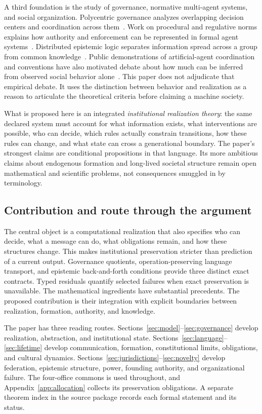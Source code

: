 \documentclass[11pt,letterpaper]{article}
\theoremstyle{plain}
\theoremstyle{definition}
\theoremstyle{remark}
\begin{document}
A third foundation is the study of governance, normative multi-agent systems, and social organization. Polycentric governance analyzes overlapping decision centers and coordination across them~\cite{ostrom,ostrombook}. Work on procedural and regulative norms explains how authority and enforcement can be represented in formal agent systems~\cite{boella,grossinorm}. Distributed epistemic logic separates information spread across a group from common knowledge~\cite{halpernmoses}. Public demonstrations of artificial-agent coordination and conventions have also motivated debate about how much can be inferred from observed social behavior alone~\cite{park,ashery,barrie,asheryreply}. This paper does not adjudicate that empirical debate. It uses the distinction between behavior and realization as a reason to articulate the theoretical criteria before claiming a machine society.

What is proposed here is an integrated \emph{institutional realization theory}: the same declared system must account for what information exists, what interventions are possible, who can decide, which rules actually constrain transitions, how these rules can change, and what state can cross a generational boundary. The paper's strongest claims are conditional propositions in that language. Its more ambitious claims about endogenous formation and long-lived societal structure remain open mathematical and scientific problems, not consequences smuggled in by terminology.

\subsection{Contribution and route through the argument}
The central object is a computational realization that also specifies who can decide, what a message can do, what obligations remain, and how these structures change. This makes institutional preservation stricter than prediction of a current output. Governance quotients, operation-preserving language transport, and epistemic back-and-forth conditions provide three distinct exact contracts. Typed residuals quantify selected failures when exact preservation is unavailable. The mathematical ingredients have substantial precedents. The proposed contribution is their integration with explicit boundaries between realization, formation, authority, and knowledge.

The paper has three reading routes. Sections~\ref{sec:model}--\ref{sec:governance} develop realization, abstraction, and institutional state. Sections~\ref{sec:language}--\ref{sec:lifetime} develop communication, formation, constitutional limits, obligations, and cultural dynamics. Sections~\ref{sec:jurisdictions}--\ref{sec:novelty} develop federation, epistemic structure, power, founding authority, and organizational failure. The four-office commons is used throughout, and Appendix~\ref{app:allocation} collects its preservation obligations. A separate theorem index in the source package records each formal statement and its status.
\end{document}
